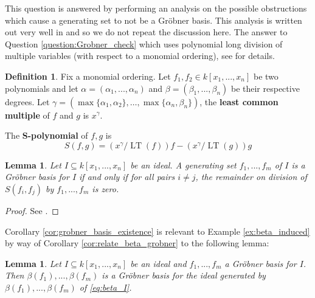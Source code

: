 \documentclass[12pt]{article}
\theoremstyle{plain}
\newtheorem{lemma}[thm]{Lemma}
\theoremstyle{definition}
\newtheorem{defn}[thm]{Definition} %
\begin{document}
This question is answered by performing an analysis on the possible obstructions which cause a generating set to not be a Gr\"{o}bner basis. This analysis is written out very well in \cite[\S 2]{grobner} and so we do not repeat the discussion here. The answer to Question \ref{question:Grobner_check} which uses polynomial long division of multiple variables (with respect to a monomial ordering), see \cite[\S 2.3]{grobner} for details.
\begin{defn}
Fix a monomial ordering. Let $f_1,f_2 \in k[x_1,...,x_n]$ be two polynomials and let $\alpha = (\alpha_1,...,\alpha_n)$ and $\beta = (\beta_1,...,\beta_n)$ be their respective degrees. Let $\gamma = (\operatorname{max}\lbrace \alpha_1,\alpha_2\rbrace,\hdots,\operatorname{max}\lbrace \alpha_n,\beta_n\rbrace)$, the \textbf{least common multiple} of $f$ and $g$ is $x^\gamma$.

The \textbf{S-polynomial} of $f,g$ is
\begin{equation}
    S(f,g) = (x^\gamma/\operatorname{LT}(f))f - (x^\gamma/\operatorname{LT}(g))g
\end{equation}
\end{defn}
\begin{lemma}\label{lem:suffices_S_poly}
Let $I \subseteq k[x_1,...,x_n]$ be an ideal. A generating set $f_1,...,f_m$ of $I$ is a Gr\"{o}bner basis for $I$ if and only if for all pairs $i \neq j$, the remainder on division of $S(f_i,f_j)$ by $f_1,...,f_m$ is zero.
\end{lemma}
\begin{proof}
See \cite[\S 2.6 Theorem 6]{grobner}.
\end{proof}
Corollary \ref{cor:grobner_basis_existence} is relevant to Example \ref{ex:beta_induced} by way of Corollary \ref{cor:relate_beta_grobner} to the following lemma:
\begin{lemma}\label{lem:grobern_betagrobner}
Let $I \subseteq k[x_1,...,x_n]$ be an ideal and $f_1,...,f_m$ a Gr\"{o}bner basis for $I$. Then $\beta(f_1),...,\beta(f_m)$ is a Gr\"{o}bner basis for the ideal generated by $\beta(f_1),...,\beta(f_m)$ of \eqref{eq:beta_I}.
\end{lemma}
\end{document}
